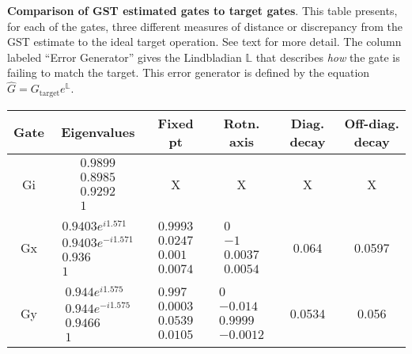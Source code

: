 {\begin{table}[h]
\begin{center}
\caption{\textbf{Comparison of GST estimated gates to target gates}.  This table presents, for each of the gates, three different measures of distance or discrepancy from the GST estimate to the ideal target operation.  See text for more detail.  The column labeled ``Error Generator'' gives the Lindbladian $\mathbb{L}$ that describes \emph{how} the gate is failing to match the target.  This error generator is defined by the equation $\hat{G} = G_{\mathrm{target}}e^{\mathbb{L}}$. \label{bestTPGatesetVsTargetTable}}
\end{center}
\end{table}

\begin{table}[h]
\begin{center}
\begin{tabular}[l]{|c|c|c|c|c|c|}
\hline
Gate & Eigenvalues & Fixed pt & Rotn. axis & Diag. decay & Off-diag. decay \\ \hline
Gi & $ \begin{array}{c}
0.9899 \\ 
0.8985 \\ 
0.9292 \\ 
1
 \end{array} $
 & X & X & X & X \\ \hline
Gx & $ \begin{array}{c}
0.9403e^{i1.571} \\ 
0.9403e^{-i1.571} \\ 
0.936 \\ 
1
 \end{array} $
 & $ \begin{array}{c}
0.9993 \\ 
0.0247 \\ 
0.001 \\ 
0.0074
 \end{array} $
 & $ \begin{array}{c}
0 \\ 
-1 \\ 
0.0037 \\ 
0.0054
 \end{array} $
 & 0.064 & 0.0597 \\ \hline
Gy & $ \begin{array}{c}
0.944e^{i1.575} \\ 
0.944e^{-i1.575} \\ 
0.9466 \\ 
1
 \end{array} $
 & $ \begin{array}{c}
0.997 \\ 
0.0003 \\ 
0.0539 \\ 
0.0105
 \end{array} $
 & $ \begin{array}{c}
0 \\ 
-0.014 \\ 
0.9999 \\ 
-0.0012
 \end{array} $
 & 0.0534 & 0.056 \\ \hline
\end{tabular}


\end{center}
\end{table}}
